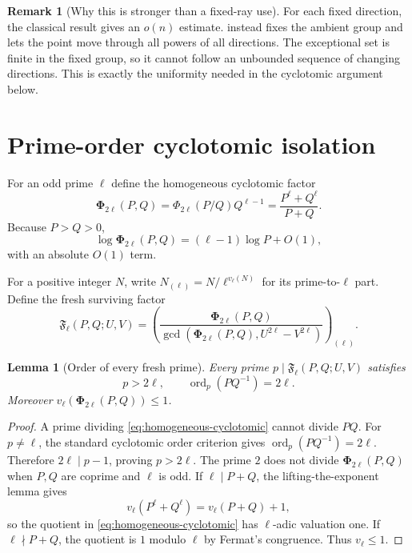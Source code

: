 \documentclass[11pt]{article}
\newtheorem{lemma}[theorem]{Lemma}
\theoremstyle{definition}
\newtheorem{remark}[theorem]{Remark}
\newcommand{\ord}{\operatorname{ord}}
\newcommand{\PhiHom}{\boldsymbol\Phi}
\begin{document}
\begin{remark}[Why this is stronger than a fixed-ray use]
For each fixed direction, the classical result gives an $o(n)$ estimate.
 instead fixes the ambient group and lets the point move
through all powers of all directions.  The exceptional set is finite in the
fixed group, so it cannot follow an unbounded sequence of changing
directions.  This is exactly the uniformity needed in the cyclotomic argument
below.
\end{remark}

\section{Prime-order cyclotomic isolation}
\label{sec:cyclotomic}

For an odd prime $\ell$ define the homogeneous cyclotomic factor
\begin{equation}
 \PhiHom_{2\ell}(P,Q)
 =\Phi_{2\ell}(P/Q)Q^{\ell-1}
 =\frac{P^\ell+Q^\ell}{P+Q}.
 \label{eq:homogeneous-cyclotomic}
\end{equation}
Because $P>Q>0$,
\begin{equation}
 \log\PhiHom_{2\ell}(P,Q)
 = (\ell-1)\log P+O(1),
 \label{eq:phi-height}
\end{equation}
with an absolute $O(1)$ term.

For a positive integer $N$, write
$N_{(\ell)}=N/\ell^{v_\ell(N)}$ for its prime-to-$\ell$ part.  Define the
fresh surviving factor
\begin{equation}
 \mathfrak F_\ell(P,Q;U,V)
 =\left(
 \frac{\PhiHom_{2\ell}(P,Q)}
 {\gcd(\PhiHom_{2\ell}(P,Q),U^{2\ell}-V^{2\ell})}
 \right)_{(\ell)}.
 \label{eq:fresh-factor}
\end{equation}

\begin{lemma}[Order of every fresh prime]
\label{lem:fresh-order}
Every prime $p\mid\mathfrak F_\ell(P,Q;U,V)$ satisfies
\begin{equation}
 p>2\ell,
 \qquad
 \ord_p(PQ^{-1})=2\ell.
 \label{eq:fresh-order}
\end{equation}
Moreover $v_\ell(\PhiHom_{2\ell}(P,Q))\le1$.
\end{lemma}

\begin{proof}
A prime dividing \eqref{eq:homogeneous-cyclotomic} cannot divide $PQ$.
For $p\ne\ell$, the standard cyclotomic order criterion gives
$\ord_p(PQ^{-1})=2\ell$.  Therefore $2\ell\mid p-1$, proving $p>2\ell$.
The prime $2$ does not divide $\PhiHom_{2\ell}(P,Q)$ when $P,Q$ are coprime
and $\ell$ is odd.  If $\ell\mid P+Q$, the lifting-the-exponent lemma gives
\[
 v_\ell(P^\ell+Q^\ell)=v_\ell(P+Q)+1,
\]
so the quotient in \eqref{eq:homogeneous-cyclotomic} has $\ell$-adic
valuation one.  If $\ell\nmid P+Q$, the quotient is $1$ modulo $\ell$ by
Fermat's congruence.  Thus $v_\ell\le1$.
\end{proof}
\end{document}

